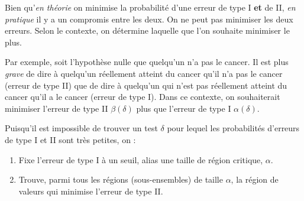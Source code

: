 \documentclass[french]{article}
\begin{document}
\begin{multicols*}{2}
\begin{center}
\end{center}

Bien qu'\textit{en théorie} on minimise la probabilité d'une erreur de type I \textbf{et} de II, \textit{en pratique} il y a un compromis entre les deux. On ne peut pas minimiser les deux erreurs. Selon le contexte, on détermine laquelle que l'on souhaite minimiser le plus.

\bigskip
Par exemple, soit l'hypothèse nulle que quelqu'un n'a pas le cancer. Il est plus \textit{grave} de dire à quelqu'un réellement atteint du cancer qu'il n'a pas le cancer (erreur de type II) que de dire à quelqu'un qui n'est pas réellement atteint du cancer qu'il a le cancer (erreur de type I). Dans ce contexte, on souhaiterait minimiser l'erreur de type II $\beta(\delta)$ plus que l'erreur de type I $\alpha(\delta)$.

\bigskip

Puisqu'il est impossible de trouver un test $\delta$ pour lequel les probabilités d'erreurs de type I et II sont très petites, on :
\begin{enumerate}[label = \circled{\arabic*}{trueblue}]
	\item	Fixe l'erreur de type I à un seuil, alias une taille de région critique, $\alpha$.
	\item	Trouve, parmi tous les régions (sous-ensembles) de taille $\alpha$, la région de valeurs qui minimise l'erreur de type II.
\end{enumerate}




\end{multicols*}
\end{document}
